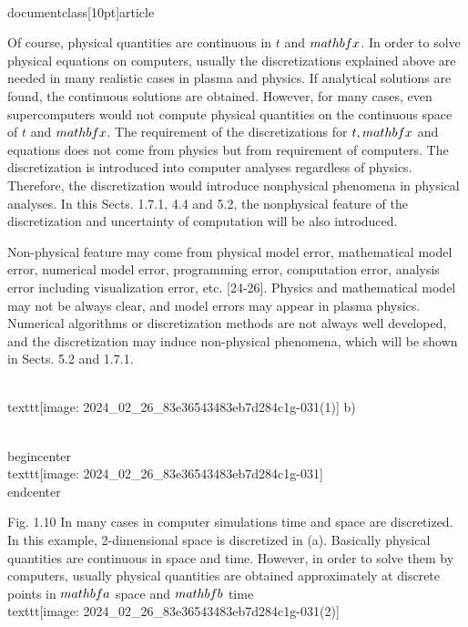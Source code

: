 \\documentclass[10pt]{article}
\begin{document}
Of course, physical quantities are continuous in $t$ and $\\mathbf{x}$. In order to solve physical equations on computers, usually the discretizations explained above are needed in many realistic cases in plasma and physics. If analytical solutions are found, the continuous solutions are obtained. However, for many cases, even supercomputers would not compute physical quantities on the continuous space of $t$ and $\\mathbf{x}$. The requirement of the discretizations for $t, \\mathbf{x}$ and equations does not come from physics but from requirement of computers. The discretization is introduced into computer analyses regardless of physics. Therefore, the discretization would introduce nonphysical phenomena in physical analyses. In this Sects. 1.7.1, 4.4 and 5.2, the nonphysical feature of the discretization and uncertainty of computation will be also introduced.

Non-physical feature may come from physical model error, mathematical model error, numerical model error, programming error, computation error, analysis error including visualization error, etc. [24-26]. Physics and mathematical model may not be always clear, and model errors may appear in plasma physics. Numerical algorithms or discretization methods are not always well developed, and the discretization may induce non-physical phenomena, which will be shown in Sects. 5.2 and 1.7.1.

\\texttt{[image: 2024\_02\_26\_83e36543483eb7d284c1g-031(1)]}
b)

\\begin{center}
\\texttt{[image: 2024\_02\_26\_83e36543483eb7d284c1g-031]}
\\end{center}

Fig. 1.10 In many cases in computer simulations time and space are discretized. In this example, 2-dimensional space is discretized in (a). Basically physical quantities are continuous in space and time. However, in order to solve them by computers, usually physical quantities are obtained approximately at discrete points in $\\mathbf{a}$ space and $\\mathbf{b}$ time
\\texttt{[image: 2024\_02\_26\_83e36543483eb7d284c1g-031(2)]}
\end{document}
